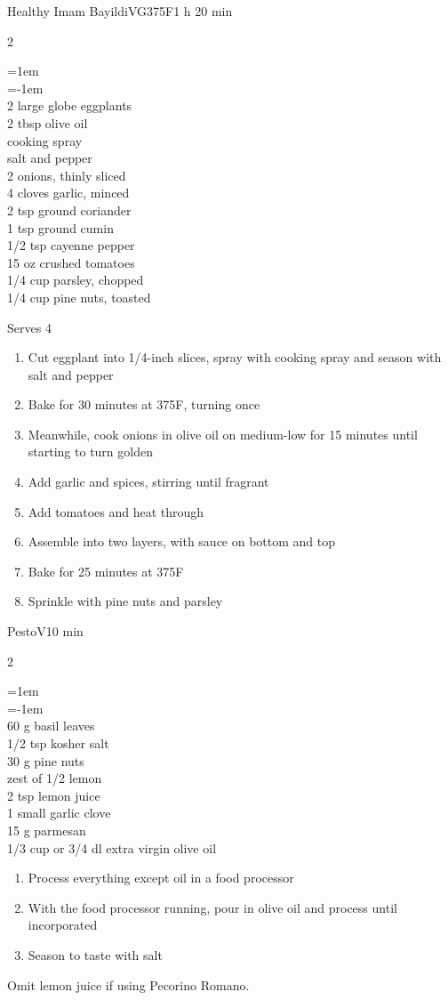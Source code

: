 \documentclass{article}
\newenvironment{recipe}[3][]
    {\begin{cardbase}[#1]{#2}{#3}
    \columnratio{0.333}
    \begin{paracol}{2}}
    {\end{paracol}\end{cardbase}}
\newenvironment{denserecipe}[3][]
    {\small
    \begin{recipe}[#1]{#2}{#3}}
    {\end{recipe}}
\newcommand{\nextcolumn}{\switchcolumn}
\newenvironment{ingredients}
    {
    \begin{obeylines}
    \vspace{\parskip}
    \setlength{\parskip}{0.25em}
    \vspace{-0.25em}
    \leftskip=1em
    \parindent=-1em}
    {\end{obeylines}}
\newenvironment{steps}
    {\begin{enumerate}[leftmargin=*,topsep=0pt]}
    {\end{enumerate}}
\newcommand{\fahrenheit}[1]{#1\textdegree{}F}
\newcommand{\tag}[1]{\hspace{1em}#1}
\newcommand{\symboltag}[2]{\tag{#1\hspace{0.4em}#2}}
\newcommand{\totaltime}[1]{\symboltag{\raisebox{-0.1em}{\small\StopWatchEnd}}{#1}}
\newcommand{\preheat}[1]{\symboltag{\Topbottomheat}{#1}}
\begin{document}
\begin{denserecipe}{Healthy Imam Bayildi}{\tag{VG}\preheat{\fahrenheit{375}}\totaltime{1 h 20 min}}
\begin{ingredients}
2 large globe eggplants
2 tbsp olive oil
cooking spray
salt and pepper
2 onions, thinly sliced
4 cloves garlic, minced
2 tsp ground coriander
1 tsp ground cumin
1/2 tsp cayenne pepper
15 oz crushed tomatoes
1/4 cup parsley, chopped
1/4 cup pine nuts, toasted
\end{ingredients}
\nextcolumn
Serves 4
\begin{steps}
    \item Cut eggplant into 1/4-inch slices, spray with cooking spray and season with salt and pepper
    \item Bake for 30 minutes at \fahrenheit{375}, turning once
    \item Meanwhile, cook onions in olive oil on medium-low for 15 minutes until starting to turn golden
    \item Add garlic and spices, stirring until fragrant
    \item Add tomatoes and heat through
    \item Assemble into two layers, with sauce on bottom and top
    \item Bake for 25 minutes at \fahrenheit{375}
    \item Sprinkle with pine nuts and parsley
\end{steps}
\end{denserecipe}

\begin{recipe}{Pesto}{\tag{V}\totaltime{10 min}}
\begin{ingredients}
60 g basil leaves 
1/2 tsp kosher salt
30 g pine nuts
zest of 1/2 lemon
2 tsp lemon juice
1 small garlic clove
15 g parmesan
1/3 cup or 3/4 dl extra virgin olive oil
\end{ingredients}
\nextcolumn
\begin{steps}
    \item Process everything except oil in a food processor
    \item With the food processor running, pour in olive oil and process until incorporated
    \item Season to taste with salt
\end{steps}
Omit lemon juice if using Pecorino Romano.
\end{recipe}
\end{document}
